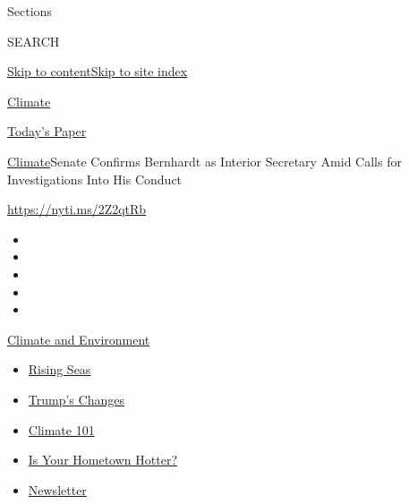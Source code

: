 Sections

SEARCH

\protect\hyperlink{site-content}{Skip to
content}\protect\hyperlink{site-index}{Skip to site index}

\href{https://www.nytimes.com/section/climate}{Climate}

\href{https://myaccount.nytimes.com/auth/login?response_type=cookie\&client_id=vi}{}

\href{https://www.nytimes.com/section/todayspaper}{Today's Paper}

\href{/section/climate}{Climate}\textbar{}Senate Confirms Bernhardt as
Interior Secretary Amid Calls for Investigations Into His Conduct

\url{https://nyti.ms/2Z2qtRb}

\begin{itemize}
\item
\item
\item
\item
\item
\end{itemize}

\href{https://www.nytimes.com/section/climate?action=click\&pgtype=Article\&state=default\&region=TOP_BANNER\&context=storylines_menu}{Climate
and Environment}

\begin{itemize}
\tightlist
\item
  \href{https://www.nytimes.com/2020/07/30/climate/sea-level-inland-floods.html?action=click\&pgtype=Article\&state=default\&region=TOP_BANNER\&context=storylines_menu}{Rising
  Seas}
\item
  \href{https://www.nytimes.com/interactive/2020/climate/trump-environment-rollbacks.html?action=click\&pgtype=Article\&state=default\&region=TOP_BANNER\&context=storylines_menu}{Trump's
  Changes}
\item
  \href{https://www.nytimes.com/interactive/2020/04/19/climate/climate-crash-course-1.html?action=click\&pgtype=Article\&state=default\&region=TOP_BANNER\&context=storylines_menu}{Climate
  101}
\item
  \href{https://www.nytimes.com/interactive/2018/08/30/climate/how-much-hotter-is-your-hometown.html?action=click\&pgtype=Article\&state=default\&region=TOP_BANNER\&context=storylines_menu}{Is
  Your Hometown Hotter?}
\item
  \href{https://www.nytimes.com/newsletters/climate-change?action=click\&pgtype=Article\&state=default\&region=TOP_BANNER\&context=storylines_menu}{Newsletter}
\end{itemize}


